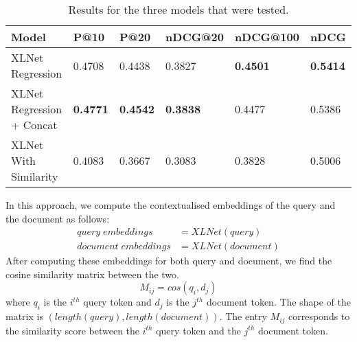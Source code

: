 \documentclass[10pt,twocolumn]{article}
\begin{document}
\begin{table*}[]
\centering
\begin{tabular}{|l|l|l|l|l|l|}
\hline
Model                     & P@10   & P@20   & nDCG@20 & nDCG@100 & nDCG   \\ \hline
XLNet Regression          & 0.4708 & 0.4438 & 0.3827  & \textbf{0.4501}   & \textbf{0.5414} \\ \hline
XLNet Regression + Concat & \textbf{0.4771} & \textbf{0.4542} & \textbf{0.3838}  & 0.4477   & 0.5386 \\ \hline
XLNet With Similarity     & 0.4083 & 0.3667 & 0.3083  & 0.3828   & 0.5006 \\ \hline
\end{tabular}
\caption{Results for the three models that were tested.}
\label{tab:1}
\end{table*}

In this approach, we compute the contextualised embeddings of the query and the document as follows:
\begin{equation}
\begin{aligned}
query\;embeddings &=XLNet(query) \\
document\;embeddings &=XLNet(document)
\end{aligned}
\end{equation}
After computing these embeddings for both query and document, we find the cosine similarity matrix between the two.
\begin{equation}
    M_{ij} = cos(q_i,d_j)
\end{equation}
where $q_i$ is the $i^{th}$ query token and $d_j$ is the $j^{th}$ document token.
The shape of the matrix is $(length(query),length(document))$. The entry $M_{ij}$ corresponds to the similarity score between the $i^{th}$ query token and the $j^{th}$ document token.
\end{document}

